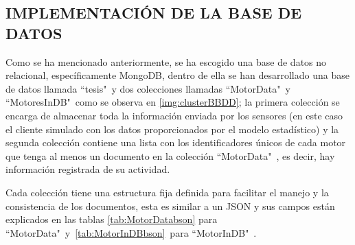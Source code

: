 

\subsection{IMPLEMENTACIÓN DE LA BASE DE DATOS}

    Como se ha mencionado anteriormente, se ha escogido una base de datos no
    relacional, específicamente MongoDB, dentro de ella se han desarrollado
    una base de datos llamada ``tesis"\   y dos colecciones llamadas ``MotorData"\  y
    ``MotoresInDB"\ como se observa en \ref{img:clusterBBDD}; la primera colección se encarga de almacenar toda la información
    enviada por los sensores (en este caso el cliente simulado con los datos
    proporcionados por el modelo estadístico) y la segunda colección contiene una
    lista con los identificadores únicos de cada motor que tenga al menos un documento
    en la colección ``MotorData"\ , es decir, hay información registrada de su actividad.

    Cada colección tiene una estructura fija definida para facilitar el manejo y
    la consistencia de los documentos, esta es similar a un JSON y sus campos
    están explicados en las tablas \ref{tab:MotorDatabson} para ``MotorData"\  y\
    \ref{tab:MotorInDBbson}\  para ``MotorInDB"\ .

